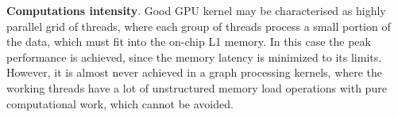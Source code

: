 \textbf{Computations intensity}. Good GPU kernel may be characterised as highly parallel grid of threads, where each group of threads process a small portion of the data, which must fit into the on-chip L1 memory. In this case the peak performance is achieved, since the memory latency is minimized to its limits. However, it is almost never achieved in a graph processing kernels, where the working threads have a lot of unstructured memory load operations with pure computational work, which cannot be avoided.\\
